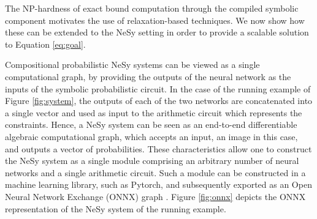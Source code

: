 
The NP-hardness of exact bound computation through the compiled symbolic component motivates the use of relaxation-based techniques. We now show how these can be extended to the NeSy setting in order to provide a scalable solution to Equation \ref{eq:goal}. 

Compositional probabilistic NeSy systems can be viewed as a single computational graph, by providing the outputs of the neural network as the inputs of the symbolic probabilistic circuit. In the case of the running example of Figure \ref{fig:system}, the outputs of each of the two networks are concatenated into a single vector and used as input to the arithmetic circuit which represents the constraints. Hence, a NeSy system can be seen as an end-to-end differentiable algebraic computational graph, which accepts an input, an image in this case, and outputs a vector of probabilities. These characteristics allow one to construct the NeSy system as a single module comprising an arbitrary number of neural networks and a single arithmetic circuit. Such a module can be constructed in a machine learning library, such as Pytorch, and subsequently exported as an Open Neural Network Exchange (ONNX) graph \cite{onnxruntime}. Figure \ref{fig:onnx} depicts the ONNX representation of the NeSy system of the running example.





